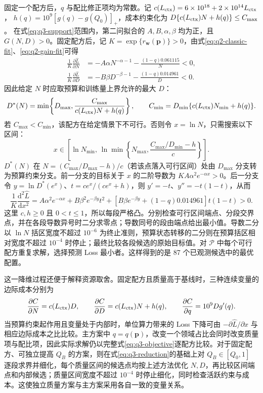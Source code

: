 固定一个配方后，$q$ 与配比修正项均为常数。记
$c(L_{\rm ctx})=6\times10^{18}+2\times10^{14}L_{\rm ctx}$，
$h(q)=10^9[g(q)-g(Q_0)]_+$，成本约束化为
$D\{c(L_{\rm ctx})N+h(q)\}\leq C_{\max}$。
在式\eqref{eq:q3-support}范围内，第二问拟合的 $A,B,\alpha,\beta$ 均为正，且 $G(N,D)>0$。固定配方后，记 $K=\exp\{r_{\boldsymbol w}(\boldsymbol p)\}>0$，由式\eqref{eq:q2-classic-fit}、\eqref{eq:q2-gain-fit}可得
\begin{align}
 \frac{1}{K}\frac{\partial\widehat L}{\partial N}
 &=-A\alpha N^{-\alpha-1}-\frac{(1-q)0.061115}{N}<0,\nonumber\\
 \frac{1}{K}\frac{\partial\widehat L}{\partial D}
 &=-B\beta D^{-\beta-1}-\frac{(1-q)0.014961}{D}<0.
 \label{eq:q3-monotonicity}
\end{align}
因此给定 $N$ 时应取预算和训练量上界允许的最大 $D$：
\begin{equation}
 D^*(N)=\min\!\left\{D_{\max},
 \frac{C_{\max}}{c(L_{\rm ctx})N+h(q)}\right\},\qquad
 C_{\min}=D_{\min}\{c(L_{\rm ctx})N_{\min}+h(q)\}.
 \label{eq:q3-reduction}
\end{equation}
若 $C_{\max}<C_{\min}$，该配方在给定情景下不可行。否则令 $x=\ln N$，只需搜索以下区间：
\[
x\in\left[\ln N_{\min},\,
\ln\min\left\{N_{\max},\frac{C_{\max}/D_{\min}-h}{c}\right\}\right].
\]
$D^*(N)$ 在 $N=(C_{\max}/D_{\max}-h)/c$（若该点落入可行区间）处由 $D_{\max}$ 分支转为预算约束分支。前一分支的目标关于 $x$ 的二阶导数为 $KA\alpha^2e^{-\alpha x}>0$。后一分支令 $y=\ln D^*(e^x)$、$t=ce^x/(ce^x+h)$，则 $y'=-t$、$y''=-t(1-t)$，从而
\begin{equation}
 \frac{1}{K}\frac{\mathrm d^2\widehat L}{\mathrm dx^2}
 =A\alpha^2e^{-\alpha x}
 +B\beta^2e^{-\beta y}t^2
 +\left[B\beta e^{-\beta y}+(1-q)0.014961\right]t(1-t)>0.
 \label{eq:q3-piecewise-convexity}
\end{equation}
这里 $c,h\geq0$ 且 $0<t\leq1$，所以每段严格凸。分别检查可行区间端点、分段交界点，并在各段导数异号时二分求零点；导数同号的段由端点给出最小值。导数二分以 $\ln N$ 括区宽度不超过 $10^{-6}$ 为终止准则，预算状态转移的二分则在预算括区相对宽度不超过 $10^{-4}$ 时停止；最终比较各段候选的原始目标值。对 $\mathcal P$ 中每个可行配方重复求解，选择预测 Loss 最小者。这样得到的是 87 个已观测候选中的最优配置。

这一降维过程还便于解释资源取舍。固定配方且质量高于基线时，三种连续变量的边际成本分别为
\begin{equation}
 \frac{\partial C}{\partial N}=c(L_{\rm ctx})D,\qquad
 \frac{\partial C}{\partial D}=c(L_{\rm ctx})N+h(q),\qquad
 \frac{\partial C}{\partial q}=10^9Dg'(q).
 \label{eq:q3-marginal-cost}
\end{equation}
当预算约束起作用且变量处于内部时，单位算力带来的 Loss 下降可由 $-\partial\widehat L/\partial x$ 与相应边际成本之比比较\cite{wright2022}。主方案中 $q=q(\boldsymbol p)$，改变一个领域占比会同时改变质量项与配比项，因此实际求解仍以完整式\eqref{eq:q3-objective}逐配方比较。对于固定配方、可独立提高 $Q_B$ 的方案，则在式\eqref{eq:q3-reduction}的基础上对 $Q_B\in[Q_0,1]$ 逐段求界并细化，每个质量区间的候选点均按上述方法优化 $N,D$，再比较区间端点和内部候选；质量区间宽度不超过 $10^{-4}$ 时停止细化，同时检查活跃约束与成本。这使独立质量方案与主方案采用各自一致的变量关系。

